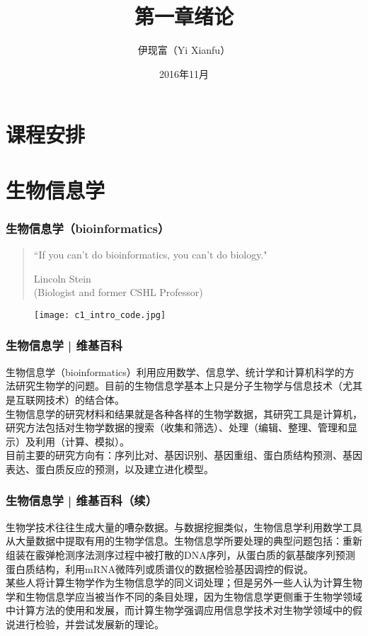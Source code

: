 



\title[绪论]{第一章\quad 绪论}
\author[Yixf]{伊现富（Yi Xianfu）}
\date{2016年11月}



\section{课程安排}


\section{生物信息学}
\begin{frame}
  \frametitle{生物信息学（bioinformatics）}
  \begin{quotation}
    ``If you can't do bioinformatics, you can't do biology."
    \begin{flushright}
    Lincoln Stein\\
    (Biologist and former CSHL Professor)
  \end{flushright}
  \end{quotation}
  \vspace{-1em}
  \begin{figure}
    \centering
    \texttt{[image: c1\_intro\_code.jpg]}
  \end{figure}
\end{frame}

\begin{frame}
  \frametitle{生物信息学 | 维基百科}
  生物信息学（bioinformatics）利用应用数学、信息学、统计学和计算机科学的方法研究生物学的问题。目前的生物信息学基本上只是分子生物学与信息技术（尤其是互联网技术）的结合体。\\
  \vspace{1em}
  生物信息学的研究材料和结果就是各种各样的生物学数据，其研究工具是计算机，研究方法包括对生物学数据的搜索（收集和筛选）、处理（编辑、整理、管理和显示）及利用（计算、模拟）。\\
  \vspace{1em}
  目前主要的研究方向有：序列比对、基因识别、基因重组、蛋白质结构预测、基因表达、蛋白质反应的预测，以及建立进化模型。
\end{frame}

\begin{frame}
  \frametitle{生物信息学 | 维基百科（续）}
  生物学技术往往生成大量的嘈杂数据。与数据挖掘类似，生物信息学利用数学工具从大量数据中提取有用的生物学信息。生物信息学所要处理的典型问题包括：重新组装在霰弹枪测序法测序过程中被打散的DNA序列，从蛋白质的氨基酸序列预测蛋白质结构，利用mRNA微阵列或质谱仪的数据检验基因调控的假说。\\
  \vspace{1em}
  某些人将计算生物学作为生物信息学的同义词处理；但是另外一些人认为计算生物学和生物信息学应当被当作不同的条目处理，因为生物信息学更侧重于生物学领域中计算方法的使用和发展，而计算生物学强调应用信息学技术对生物学领域中的假说进行检验，并尝试发展新的理论。
\end{frame}


